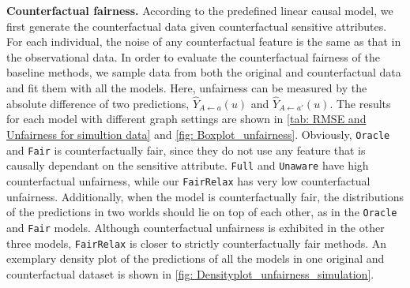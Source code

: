 \documentclass{article}
\begin{document}

\textbf{Counterfactual fairness.} According to the predefined linear causal model, we first generate the counterfactual data given counterfactual sensitive attributes. For each individual, the noise of any counterfactual feature is the same as that in the observational data. In order to evaluate the counterfactual fairness of the baseline methods, we sample data from both the original and counterfactual data and fit them with all the models. 
Here, unfairness can be measured by the absolute difference of two predictions, $\hat{Y}_{A \leftarrow a}(u)$ and $\hat{Y}_{A \leftarrow a'}(u)$. The results for each model with different graph settings are shown in \cref{tab: RMSE and Unfairness for simultion data} and \cref{fig: Boxplot_unfairness}. Obviously, \texttt{Oracle} and \texttt{Fair} is counterfactually fair, since they do not use any feature that is causally dependant on the sensitive attribute. \texttt{Full} and \texttt{Unaware} have high counterfactual unfairness, while our \texttt{FairRelax} has very low counterfactual unfairness. Additionally, when the model is counterfactually fair, the distributions of the predictions in two worlds should lie on top of each other, as in the \texttt{Oracle} and \texttt{Fair} models. Although counterfactual unfairness is exhibited in the other three models, \texttt{FairRelax} is closer to strictly counterfactually fair methods. An exemplary density plot of the predictions of all the models in one original and counterfactual dataset is %
shown in \cref{fig: Densityplot_unfairness_simulation}.
\end{document}
